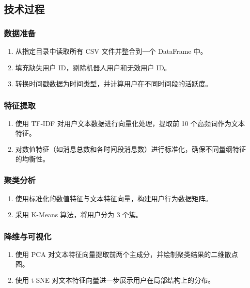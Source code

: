 \documentclass{paper}
\begin{document}
\subsection{技术过程}

\subsubsection{数据准备}
\begin{enumerate}
    \item 从指定目录中读取所有 CSV 文件并整合到一个 DataFrame 中。
    \item 填充缺失用户 ID，剔除机器人用户和无效用户 ID。
    \item 转换时间戳数据为时间类型，并计算用户在不同时间段的活跃度。
\end{enumerate}

\subsubsection{特征提取}
\begin{enumerate}
    \item 使用 TF-IDF 对用户文本数据进行向量化处理，提取前 10 个高频词作为文本特征。
    \item 对数值特征（如消息总数和各时间段消息数）进行标准化，确保不同量纲特征的均衡性。
\end{enumerate}

\subsubsection{聚类分析}
\begin{enumerate}
    \item 使用标准化的数值特征与文本特征向量，构建用户行为数据矩阵。
    \item 采用 K-Means 算法，将用户分为 3 个簇。
\end{enumerate}

\subsubsection{降维与可视化}
\begin{enumerate}
    \item 使用 PCA 对文本特征向量提取前两个主成分，并绘制聚类结果的二维散点图。
    \item 使用 t-SNE 对文本特征向量进一步展示用户在局部结构上的分布。
    \end{enumerate}
\end{document}
